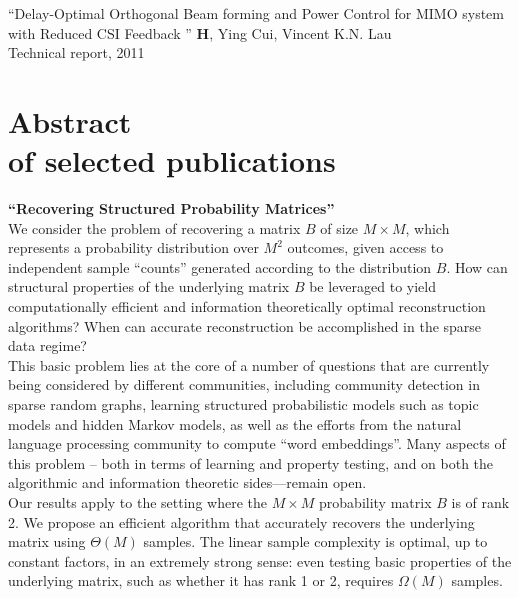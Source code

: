 \documentclass[margin,line,11pt]{resume}
\begin{document}
\begin{resume}
``Delay-Optimal Orthogonal Beam forming and Power Control for MIMO system with Reduced CSI Feedback
'' \textbf{H}, Ying Cui, Vincent K.N. Lau
\\
Technical report, 2011

\medskip

\section{\mysidestyle Abstract \\ of selected publications}

\textbf{``Recovering Structured Probability Matrices''}
\\
We consider the problem of recovering a matrix $B$ of size $M\times M$, which represents a
probability distribution over $M^2$ outcomes, given access to independent sample ``counts'' generated
according to the distribution $B$. How can structural properties of the underlying matrix $B$ be
leveraged to yield computationally efficient and information theoretically optimal reconstruction
algorithms? When can accurate reconstruction be accomplished in the sparse data regime?
\\
This basic problem lies at the core of a number of questions that are currently being considered by
different communities, including community detection in sparse random graphs, learning structured
probabilistic models such as topic models and hidden Markov models, as well as the efforts from the
natural language processing community to compute ``word embeddings''. Many aspects of this problem --
both in terms of learning and property testing, and on both the algorithmic and information
theoretic sides—remain open.
\\
Our results apply to the setting where the $M\times M$ probability matrix $B$ is of rank 2. We propose an
efficient algorithm that accurately recovers the underlying matrix using $\Theta(M)$ samples. The linear
sample complexity is optimal, up to constant factors, in an extremely strong sense: even testing
basic properties of the underlying matrix, such as whether it has rank 1 or 2, requires $\Omega(M)$
samples.


\end{resume}
\end{document}
